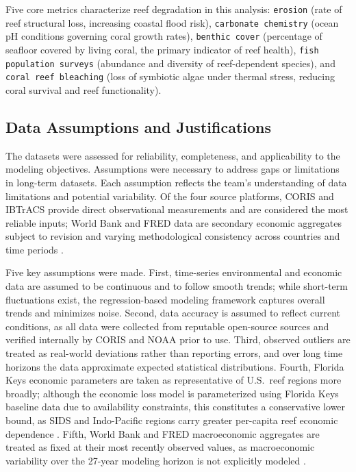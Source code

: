 \documentclass[10pt,letterpaper]{article}
\begin{document}
Five core metrics characterize reef degradation in this analysis: \texttt{erosion} (rate of reef structural loss, increasing coastal flood risk), \texttt{carbonate chemistry} (ocean pH conditions governing coral growth rates), \texttt{benthic cover} (percentage of seafloor covered by living coral, the primary indicator of reef health), \texttt{fish population surveys} (abundance and diversity of reef-dependent species), and \texttt{coral reef bleaching} (loss of symbiotic algae under thermal stress, reducing coral survival and reef functionality).

\subsection{Data Assumptions and Justifications}

The datasets were assessed for reliability, completeness, and applicability to the modeling objectives. Assumptions were necessary to address gaps or limitations in long-term datasets. Each assumption reflects the team's understanding of data limitations and potential variability. Of the four source platforms, CORIS and IBTrACS provide direct observational measurements and are considered the most reliable inputs; World Bank and FRED data are secondary economic aggregates subject to revision and varying methodological consistency across countries and time periods \cite{noaa_coris, ibtracs, world_bank, fred}.

Five key assumptions were made. First, time-series environmental and economic data are assumed to be continuous and to follow smooth trends; while short-term fluctuations exist, the regression-based modeling framework captures overall trends and minimizes noise. Second, data accuracy is assumed to reflect current conditions, as all data were collected from reputable open-source sources and verified internally by CORIS and NOAA prior to use. Third, observed outliers are treated as real-world deviations rather than reporting errors, and over long time horizons the data approximate expected statistical distributions. Fourth, Florida Keys economic parameters are taken as representative of U.S.\ reef regions more broadly; although the economic loss model is parameterized using Florida Keys baseline data due to availability constraints, this constitutes a conservative lower bound, as SIDS and Indo-Pacific regions carry greater per-capita reef economic dependence \cite{cesar_beukering_2004}. Fifth, World Bank and FRED macroeconomic aggregates are treated as fixed at their most recently observed values, as macroeconomic variability over the 27-year modeling horizon is not explicitly modeled \cite{world_bank, fred}.
\end{document}
